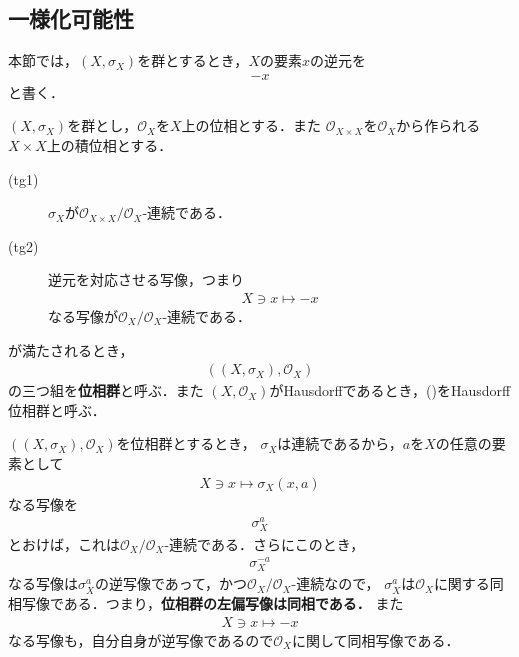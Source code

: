 \subsection{一様化可能性}
	本節では，$\left(X,\sigma_X\right)$を群とするとき，$X$の要素$x$の逆元を
	\begin{align}
		-x
	\end{align}
	と書く．
	
	\begin{screen}
		\begin{dfn}[位相群]\label{def:topological_group}
			$\left(X,\sigma_X\right)$を群とし，$\mathscr{O}_X$を$X$上の位相とする．また
			$\mathscr{O}_{X \times X}$を$\mathscr{O}_X$から作られる$X \times X$上の積位相とする．
			\begin{description}
				\item[(tg1)] $\sigma_X$が$\mathscr{O}_{X \times X}/\mathscr{O}_X$-連続である．
				\item[(tg2)] 逆元を対応させる写像，つまり
					\begin{align}
						X \ni x \longmapsto -x
					\end{align}
					なる写像が$\mathscr{O}_X/\mathscr{O}_X$-連続である．
			\end{description}
			が満たされるとき，
			\begin{align}
				\left(\left(X,\sigma_X\right),\mathscr{O}_X\right)
				\label{pair_topological_group}
			\end{align}
			の三つ組を{\bf 位相群}と呼ぶ．また
			$(X,\mathscr{O}_X)$がHausdorffであるとき，()をHausdorff位相群と呼ぶ．
		\end{dfn}
	\end{screen}
	
	$\left(\left(X,\sigma_X\right),\mathscr{O}_X\right)$を位相群とするとき，
	$\sigma_X$は連続であるから，$a$を$X$の任意の要素として
	\begin{align}
		X \ni x \longmapsto \sigma_X(x,a)
	\end{align}
	なる写像を
	\begin{align}
		\sigma_X^a
	\end{align}
	とおけば，これは$\mathscr{O}_X/\mathscr{O}_X$-連続である．さらにこのとき，
	\begin{align}
		\sigma_X^{-a}
	\end{align}
	なる写像は$\sigma_X^a$の逆写像であって，かつ$\mathscr{O}_X/\mathscr{O}_X$-連続なので，
	$\sigma_X^a$は$\mathscr{O}_X$に関する同相写像である．つまり，{\bf 位相群の左偏写像は同相である．}
	また
	\begin{align}
		X \ni x \longmapsto -x
	\end{align}
	なる写像も，自分自身が逆写像であるので$\mathscr{O}_X$に関して同相写像である．
	

